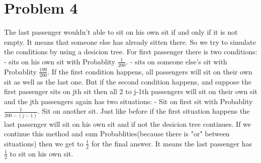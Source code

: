 \documentclass[12pt]{article}
\begin{document}
\section*{Problem 4}
The last passenger wouldn't able to sit on his own sit if and only if it is not empty.
It means that someone else has already sitten there.
So we try to simulate the conditions by using a desicion tree.
\newline For first passenger there is two conditions:
\newline{}- sits on his own sit with Probablity $ \frac{1}{200} $.
- sits on someone else's sit with Probablity $\frac{199}{200}$.
\newline\newline If the first condition happens, all passengers will sit on their own sit as well as the last one.
\newline But if the second condition happens, and suppose the first passenger sits on jth sit
then all 2 to j-1th passengers will sit on their own sit and the jth passengers again has two situations:
\newline{}- Sit on first sit with Probablity $\frac{1}{200-(j-1)}$.
 Sit on another sit.
\newline\newline Just like before if the first situation happens the last passenger will sit on his own sit
and if not the desicion tree continues.
\newline If we continue this method and sum Probablities(because there is "or" between situations)
then we get to $\frac{1}{2}$ for the final answer.
\newline It means the last passenger has $\frac{1}{2}$ to sit on his own sit.
\end{document}
